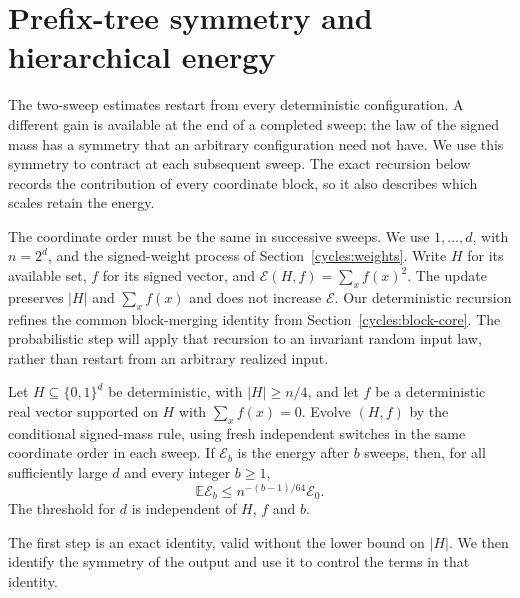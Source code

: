 \section{Prefix-tree symmetry and hierarchical energy}\label{prefix:section}
The two-sweep estimates restart from every deterministic configuration.
A different gain is available at the end of a completed sweep: the law
of the signed mass has a symmetry that an arbitrary configuration need
not have.  We use this symmetry to contract at each subsequent sweep.
The exact recursion below records the contribution of every coordinate
block, so it also describes which scales retain the energy.

The coordinate order must be the same in successive sweeps. We use
$1,\ldots,d$, with $n=2^d$, and the signed-weight process of
Section~\ref{cycles:weights}. Write $H$ for its available set, $f$
for its signed vector, and $\mathcal E(H,f)=\sum_xf(x)^2$.
The update preserves $|H|$ and $\sum_xf(x)$ and does not increase
$\mathcal E$. Our deterministic recursion refines the common
block-merging identity from Section~\ref{cycles:block-core}. The
probabilistic step will apply that recursion to an invariant random
input law, rather than restart from an arbitrary realized input.

\begin{theorem}\label{prefix:contraction}
Let $H\subseteq\{0,1\}^d$ be deterministic, with $|H|\ge n/4$, and
let $f$ be a deterministic real vector supported on $H$ with
$\sum_x f(x)=0$.  Evolve $(H,f)$ by the conditional signed-mass rule,
using fresh independent switches in the same coordinate order in each
sweep.  If $\mathcal E_b$ is the energy after $b$ sweeps, then, for
all sufficiently large $d$ and every integer $b\ge1$,
\begin{equation}\label{prefix:energy}
 \mathbb E\mathcal E_b\le n^{-(b-1)/64}\mathcal E_0.
\end{equation}
The threshold for $d$ is independent of $H$, $f$ and $b$.
\end{theorem}

The first step is an exact identity, valid without the lower bound on
$|H|$.  We then identify the symmetry of the output and use it to
control the terms in that identity.

